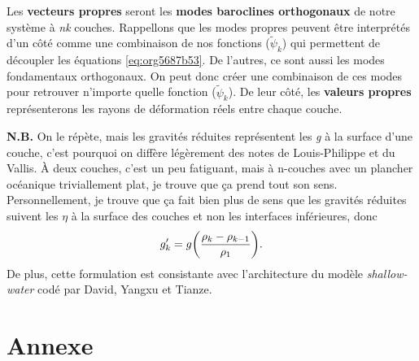 \documentclass[10pt]{article}
\numberwithin{equation}{section}
\newcommand{\tpsi}{\tilde{\psi}}
\begin{document}
Les \textbf{vecteurs propres} seront les \textbf{modes baroclines orthogonaux} de notre système à \emph{nk} couches.
Rappellons que les modes propres peuvent être interprétés d'un côté comme une combinaison de nos fonctions (\(\tpsi_k\)) qui permettent de découpler les équations \ref{eq:org5687b53}.
De l'autres, ce sont aussi les modes fondamentaux orthogonaux.
On peut donc créer une combinaison de ces modes pour retrouver n'importe quelle fonction (\(\tpsi_k\)).
De leur côté, les \textbf{valeurs propres} représenterons les rayons de déformation réels entre chaque couche.\bigskip



\textbf{N.B.} On le répète, mais les gravités réduites représentent les \emph{g} à la surface d'une couche, c'est pourquoi on diffère légèrement des notes de Louis-Philippe et du Vallis.
À deux couches, c'est un peu fatiguant, mais à n-couches avec un plancher océanique triviallement plat, je trouve que ça prend tout son sens.
Personnellement, je trouve que ça fait bien plus de sens que les gravités réduites suivent les \(\eta\) à la surface des couches et non les interfaces inférieures, donc
\begin{equation}
g_k' = g \qty(\frac{\rho_k - \rho_{k-1}}{\rho_1}).
\end{equation}
De plus, cette formulation est consistante avec l'architecture du modèle \emph{shallow-water} codé par David, Yangxu et Tianze.


\printbibliography


\section{Annexe}
\label{sec:orgdd7e470}
\end{document}
